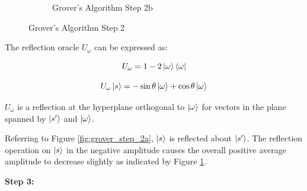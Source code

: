 \documentclass{article}
\begin{document}
\begin{figure}[h]
\begin{subfigure}{0.5\textwidth}
      
      \caption{\label{fig:grover_step_2b} Grover's Algorithm Step 2b}
  \end{subfigure}
  \caption{\label{fig:grover_step_2} Grover's Algorithm Step 2}
\end{figure}
\vspace{5mm}

The reflection oracle $U_\omega$ can be expressed as:
\vspace{5mm}

\begin{equation}
U_\omega = 1 - 2\ket{\omega}\bra{\omega}    
\end{equation}

\vspace{5mm}

\begin{equation}
U_\omega \ket{s} = -\sin\theta\ket{\omega} +  \cos\theta\ket{\omega}    
\end{equation} 
\vspace{5mm}

\noindent
$U_{{\omega }}$ is a reflection at the hyperplane orthogonal to $\ket{\omega}$  for vectors in the plane spanned by $\ket{s'}$  and $\ket{\omega}$\cite{noauthor_grovers_2022}.
\vspace{5mm}

\noindent
Referring to Figure \ref{fig:grover_step_2a}, $\ket{s}$ is reflected about $\ket{s'}$. The reflection operation on $\ket{s}$ in the negative amplitude causes the overall positive average amplitude to decrease slightly as indicated by Figure \ref{fig:grover_step_2b}. 
\pagebreak

\textbf{Step 3:}
\vspace{5mm}
\end{document}
